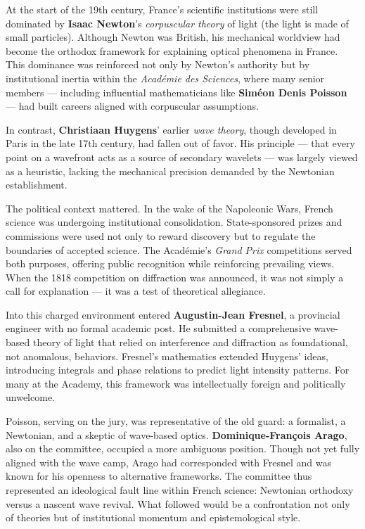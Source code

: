 \begin{historical}
At the start of the 19th century, France’s scientific institutions were still dominated by \textbf{Isaac Newton}’s \emph{corpuscular theory} of light (the light is made of small particles). Although Newton was British, his mechanical worldview had become the orthodox framework for explaining optical phenomena in France. This dominance was reinforced not only by Newton’s authority but by institutional inertia within the \emph{Académie des Sciences}, where many senior members — including influential mathematicians like \textbf{Siméon Denis Poisson} — had built careers aligned with corpuscular assumptions.

In contrast, \textbf{Christiaan Huygens}’ earlier \emph{wave theory}, though developed in Paris in the late 17th century, had fallen out of favor. His principle — that every point on a wavefront acts as a source of secondary wavelets — was largely viewed as a heuristic, lacking the mechanical precision demanded by the Newtonian establishment.

The political context mattered. In the wake of the Napoleonic Wars, French science was undergoing institutional consolidation. State-sponsored prizes and commissions were used not only to reward discovery but to regulate the boundaries of accepted science. The Académie’s \emph{Grand Prix} competitions served both purposes, offering public recognition while reinforcing prevailing views. When the 1818 competition on diffraction was announced, it was not simply a call for explanation — it was a test of theoretical allegiance.

Into this charged environment entered \textbf{Augustin-Jean Fresnel}, a provincial engineer with no formal academic post. He submitted a comprehensive wave-based theory of light that relied on interference and diffraction as foundational, not anomalous, behaviors. Fresnel’s mathematics extended Huygens’ ideas, introducing integrals and phase relations to predict light intensity patterns. For many at the Academy, this framework was intellectually foreign and politically unwelcome.

Poisson, serving on the jury, was representative of the old guard: a formalist, a Newtonian, and a skeptic of wave-based optics. \textbf{Dominique-François Arago}, also on the committee, occupied a more ambiguous position. Though not yet fully aligned with the wave camp, Arago had corresponded with Fresnel and was known for his openness to alternative frameworks. The committee thus represented an ideological fault line within French science: Newtonian orthodoxy versus a nascent wave revival. What followed would be a confrontation not only of theories but of institutional momentum and epistemological style.
\end{historical}
